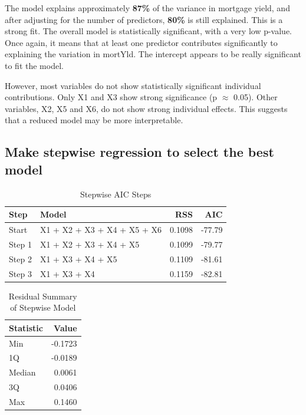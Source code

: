 \documentclass[
  11pt,
]{article}
\begin{document}
The model explains approximately \textbf{87\%} of the variance in
mortgage yield, and after adjusting for the number of predictors,
\textbf{80\%} is still explained. This is a strong fit. The overall
model is statistically significant, with a very low p-value. Once again,
it means that at least one predictor contributes significantly to
explaining the variation in mortYld. The intercept appears to be really
significant to fit the model.

However, most variables do not show statistically significant individual
contributions. Only X1 and X3 show strong significance (p \(\approx\)
0.05). Other variables, X2, X5 and X6, do not show strong individual
effects. This suggests that a reduced model may be more interpretable.

\subsection{Make stepwise regression to select the best
model}\label{make-stepwise-regression-to-select-the-best-model}

\begin{table}[!h]
\centering
\caption{\label{tab:unnamed-chunk-11}Stepwise AIC Steps}
\centering
\fontsize{8}{10}\selectfont
\begin{tabular}[t]{llrr}
\toprule
Step & Model & RSS & AIC\\
\midrule
Start & X1 + X2 + X3 + X4 + X5 + X6 & 0.1098 & -77.79\\
Step 1 & X1 + X2 + X3 + X4 + X5 & 0.1099 & -79.77\\
Step 2 & X1 + X3 + X4 + X5 & 0.1109 & -81.61\\
Step 3 & X1 + X3 + X4 & 0.1159 & -82.81\\
\bottomrule
\end{tabular}
\end{table}
\begin{table}[!h]
\centering
\caption{\label{tab:unnamed-chunk-12}Residual Summary of Stepwise Model}
\centering
\fontsize{8}{10}\selectfont
\begin{tabular}[t]{lr}
\toprule
Statistic & Value\\
\midrule
Min & -0.1723\\
1Q & -0.0189\\
Median & 0.0061\\
3Q & 0.0406\\
Max & 0.1460\\
\bottomrule
\end{tabular}
\end{table}
\end{document}

